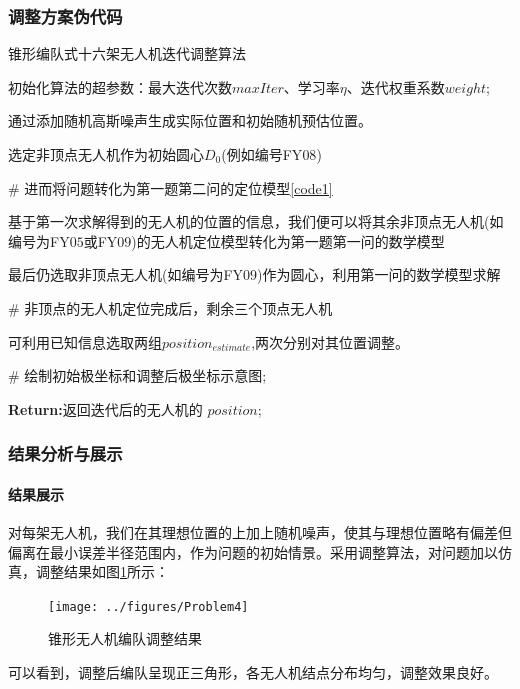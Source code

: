 \documentclass[withoutpreface,bwprint]{cumcmthesis} %
\begin{document}
		\subsubsection{调整方案伪代码}
		\begin{algorithm}[H]
			\caption{锥形编队式十六架无人机迭代调整算法}
			\par 初始化算法的超参数：最大迭代次数$ maxIter $、学习率$ \eta $、迭代权重系数$ weight $;
			\par 通过添加随机高斯噪声生成实际位置和初始随机预估位置。
			\par 选定非顶点无人机作为初始圆心$ D_0 $(例如编号FY$ 08 $)
			\par \# 进而将问题转化为第一题第二问的定位模型\ref{code1}
			\par 基于第一次求解得到的无人机的位置的信息，我们便可以将其余非顶点无人机(如编号为FY$ 05$或FY$ 09 $)的无人机定位模型转化为第一题第一问的数学模型
			\par 最后仍选取非顶点无人机(如编号为FY$09$)作为圆心，利用第一问的数学模型求解
			\par \# 非顶点的无人机定位完成后，剩余三个顶点无人机
			\par 可利用已知信息选取两组$ position_{estimate} $,两次分别对其位置调整。
			\par \# 绘制初始极坐标和调整后极坐标示意图;		
			
			\textbf{Return:}返回迭代后的无人机的 $position$;
			\label{code4}
		\end{algorithm}
		\subsubsection{结果分析与展示}
		\paragraph{结果展示}
		对每架无人机，我们在其理想位置的上加上随机噪声，使其与理想位置略有偏差但偏离在最小误差半径范围内，作为问题的初始情景。采用调整算法，对问题加以仿真，调整结果如图\ref{锥形调整结果}所示：
		\begin{figure}[htb]
			\centering
			\texttt{[image: ../figures/Problem4]}
			\caption{锥形无人机编队调整结果}
			\label{锥形调整结果}
		\end{figure}
		可以看到，调整后编队呈现正三角形，各无人机结点分布均匀，调整效果良好。
\end{document}
